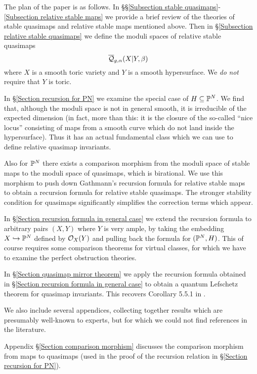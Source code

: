 The plan of the paper is as follows. In \S\S \ref{Subsection stable quasimaps}-\ref{Subsection relative stable maps} we provide a brief review of the theories of stable quasimaps and relative stable maps mentioned above. Then in \S \ref{Subsection relative stable quasimaps} we define the moduli spaces of relative stable quasimaps
\begin{equation*} \overline{\mathcal Q}_{g,\alpha}(X|Y,\beta) \end{equation*}
where $X$ is a smooth toric variety and $Y$ is a smooth hypersurface. We \emph{do not} require that $Y$ is toric.

In \S \ref{Section recursion for PN} we examine the special case of $H \subseteq \mathbb P^N$. We find that, although the moduli space is not in general smooth, it is irreducible of the expected dimension (in fact, more than this: it is the closure of the so-called ``nice locus'' consisting of maps from a smooth curve which do not land inside the hypersurface). Thus it has an actual fundamental class which we can use to define relative quasimap invariants.

Also for $\mathbb P^N$ there exists a comparison morphism from the moduli space of stable maps to the moduli space of quasimaps, which is birational. We use this morphism to push down Gathmann's recursion formula for relative stable maps to obtain a recursion formula for relative stable quasimaps. The stronger stability condition for quasimaps significantly simplifies the correction terms which appear.

In \S \ref{Section recursion formula in general case} we extend the recursion formula to arbitrary pairs $(X,Y)$ where $Y$ is very ample, by taking the embedding $X \hookrightarrow \mathbb P^N$ defined by $\mathcal{O}_X(Y)$ and pulling back the formula for $(\mathbb P^N,H)$. This of course requires some comparison theorems for virtual classes, for which we have to examine the perfect obstruction theories.

In \S \ref{Section quasimap mirror theorem} we apply the recursion formula obtained in \S \ref{Section recursion formula in general case} to obtain a quantum Lefschetz theorem for quasimap invariants. This recovers Corollary 5.5.1 in \cite{CF-K-wallcrossing}.

We also include several appendices, collecting together results which are presumably well-known to experts, but for which we could not find references in the literature.

Appendix \S \ref{Section comparison morphism} discusses the comparison morphism from maps to quasimaps (used in the proof of the recursion relation in \S \ref{Section recursion for PN}).

